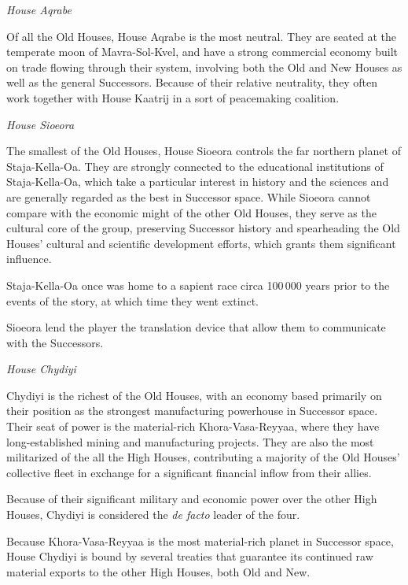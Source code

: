 \documentclass[11pt]{report}
\begin{document}
    \noindent
    \emph{House Aqrabe}

    Of all the Old Houses, House Aqrabe is the most neutral. They are seated at the temperate moon of Mavra-Sol-Kvel, and have a strong commercial economy built on trade flowing through their system, involving both the Old and New Houses as well as the general Successors. Because of their relative neutrality, they often work together with House Kaatrij in a sort of peacemaking coalition.
    \bigskip

    \noindent
    \emph{House Sioeora}

    The smallest of the Old Houses, House Sioeora controls the far northern planet of Staja-Kella-Oa. They are strongly connected to the educational institutions of Staja-Kella-Oa, which take a particular interest in history and the sciences and are generally regarded as the best in Successor space. While Sioeora cannot compare with the economic might of the other Old Houses, they serve as the cultural core of the group, preserving Successor history and spearheading the Old Houses' cultural and scientific development efforts, which grants them significant influence.

    Staja-Kella-Oa once was home to a sapient race circa 100\,000 years prior to the events of the story, at which time they went extinct.

    Sioeora lend the player the translation device that allow them to communicate with the Successors.
    \bigskip

    \noindent
    \emph{House Chydiyi}

    Chydiyi is the richest of the Old Houses, with an economy based primarily on their position as the strongest manufacturing powerhouse in Successor space. Their seat of power is the material-rich Khora-Vasa-Reyyaa, where they have long-established mining and manufacturing projects. They are also the most militarized of the all the High Houses, contributing a majority of the Old Houses' collective fleet in exchange for a significant financial inflow from their allies.

    Because of their significant military and economic power over the other High Houses, Chydiyi is considered the \emph{de facto} leader of the four.

    Because Khora-Vasa-Reyyaa is the most material-rich planet in Successor space, House Chydiyi is bound by several treaties that guarantee its continued raw material exports to the other High Houses, both Old and New.
    \bigskip
\end{document}
